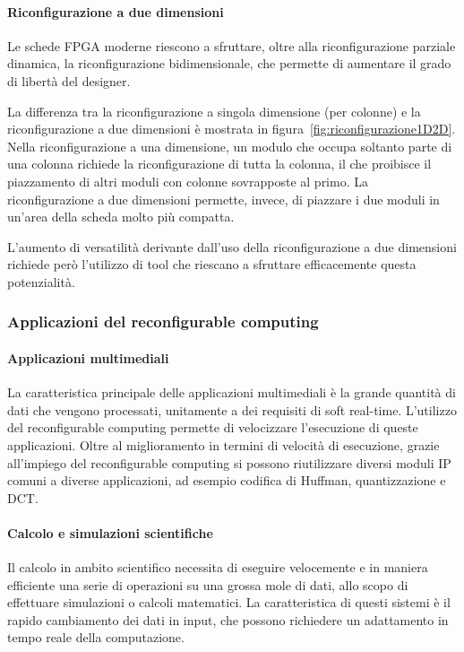 
\paragraph{Riconfigurazione a due dimensioni}
Le schede \ac{FPGA} moderne riescono a sfruttare, oltre alla riconfigurazione parziale
dinamica, la riconfigurazione bidimensionale, che permette di aumentare il grado di
libertà del designer.

La differenza tra la riconfigurazione a singola dimensione (per colonne) e la
riconfigurazione a due dimensioni è mostrata in figura~\ref{fig:riconfigurazione1D2D}.
Nella riconfigurazione a una dimensione, un modulo che occupa soltanto parte di una
colonna richiede la riconfigurazione di tutta la colonna, il che proibisce il piazzamento
di altri moduli con colonne sovrapposte al primo. La riconfigurazione a due dimensioni
permette, invece, di piazzare i due moduli in un'area della scheda molto più compatta.

L'aumento di versatilità derivante dall'uso della riconfigurazione a due dimensioni
richiede però l'utilizzo di tool che riescano a sfruttare efficacemente questa
potenzialità.



\subsubsection{Applicazioni del reconfigurable computing}
\paragraph{Applicazioni multimediali}
La caratteristica principale delle applicazioni multimediali è la grande quantità di dati che
vengono processati, unitamente a dei requisiti di soft real-time. L'utilizzo del reconfigurable
computing permette di velocizzare l'esecuzione di queste applicazioni. Oltre al miglioramento
in termini di velocità di esecuzione, grazie all'impiego del reconfigurable computing si possono
riutilizzare diversi moduli \ac{IP} comuni a diverse applicazioni, ad esempio codifica di
Huffman, quantizzazione e \ac{DCT}.

\paragraph{Calcolo e simulazioni scientifiche}
Il calcolo in ambito scientifico necessita di eseguire velocemente e in maniera efficiente
una serie di operazioni su una grossa mole di dati, allo scopo di effettuare simulazioni o
calcoli matematici. La caratteristica di questi sistemi è il rapido cambiamento dei dati in
input, che possono richiedere un adattamento in tempo reale della computazione.

